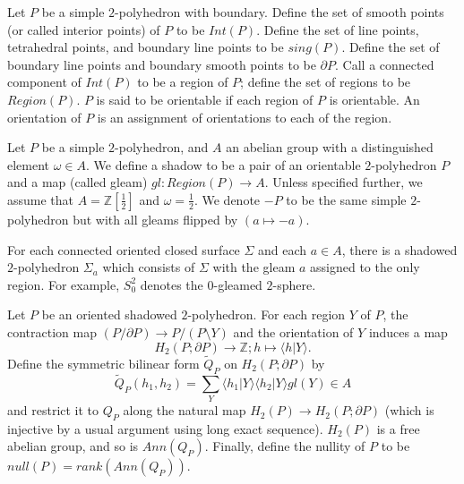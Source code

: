 \begin{definition}\label{def/components-of-a-simple-2-polyhedron}
  Let $P$ be a simple $2$-polyhedron with boundary. Define the
  set of smooth points (or called interior points) of $P$ to be
  $Int(P)$. Define the set of line points, tetrahedral points,
  and boundary line points to be $sing(P)$. Define the set of
  boundary line points and boundary smooth points to be
  $\partial P$. Call a connected component of $Int(P)$ to be a
  region of $P$; define the set of regions to be $Region(P)$. $P$
  is said to be orientable if each region of $P$ is orientable.
  An orientation of $P$ is an assignment of orientations to each
  of the region.
\end{definition}

\begin{definition}\label{def/shadowed-2-polyhedron}
  Let $P$ be a simple $2$-polyhedron, and $A$ an abelian group
  with a distinguished element $\omega \in A$. We define a shadow
  to be a pair of an orientable $2$-polyhedron $P$ and a map
  (called gleam) $gl: Region(P) \to A$. Unless specified further,
  we assume that $A = \mathbb{Z}\left[\frac{1}{2}\right]$ and
  $\omega = \frac{1}{2}$. We denote $-P$ to be the same simple
  $2$-polyhedron but with all gleams flipped by $(a \mapsto -a)$.
\end{definition}

\noindent For each connected oriented closed surface $\Sigma$ and
each $a \in A$, there is a shadowed $2$-polyhedron $\Sigma_{a}$
which consists of $\Sigma$ with the gleam $a$ assigned to the
only region. For example, $S^{2}_{0}$ denotes the $0$-gleamed
$2$-sphere.

\begin{definition}\label{def/nullity-of-a-shadowed-2-polyhedron}\cite[section VIII.5.1]{turaev-qiok-3-manifolds}
  Let $P$ be an oriented shadowed $2$-polyhedron. For each region
  $Y$ of $P$, the contraction map
  $(P / \partial P) \to P / (P \setminus Y)$ and the orientation
  of $Y$ induces a map
  $$H_{2}(P;\partial P) \to \mathbb{Z}; h \mapsto \langle h | Y \rangle.$$
  Define the symmetric bilinear form $\tilde{Q}_{P}$ on
  $H_{2}(P; \partial P)$ by
  $$\tilde{Q}_{P}(h_{1}, h_{2}) = \sum_{Y} \langle h_{1}|Y\rangle \langle h_{2}|Y\rangle gl(Y) \in A$$
  and restrict it to $Q_{P}$ along the natural map
  $H_{2}(P) \to H_{2}(P; \partial P)$ (which is injective by a
  usual argument using long exact sequence). $H_{2}(P)$ is a free
  abelian group, and so is $Ann(Q_{P})$. Finally, define the
  nullity of $P$ to be $null(P) = rank(Ann(Q_{P}))$.
\end{definition}

